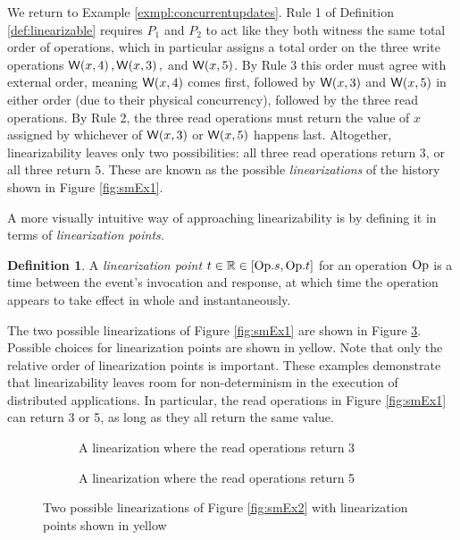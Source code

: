 \documentclass[]             %
{NASA}                       %
\newtheorem{example}{Example}
\theoremstyle{definition}
\newtheorem{definition}{Definition}[section]
\begin{document}
We return to Example \ref{exmpl:concurrentupdates}. Rule 1 of
Definition \ref{def:linearizable} requires $P_1$ and $P_2$ to act like
they both witness the same total order of operations, which in
particular assigns a total order on the three write operations
$\mathsf{W}\!\left(x, 4\right), \mathsf{W}\!\left(x, 3\right),$ and $\mathsf{W}\!\left(x, 5\right)$. By Rule 3 this order must agree with
external order, meaning $\mathsf{W}\!\left(x, 4\right)$ comes first, followed by $\mathsf{W}\!\left(x, 3\right)$ and
$\mathsf{W}\!\left(x, 5\right)$ in either order (due to their physical concurrency), followed
by the three read operations. By Rule 2, the three read operations
must return the value of $x$ assigned by whichever of $\mathsf{W}\!\left(x, 3\right)$ or
$\mathsf{W}\!\left(x, 5\right)$ happens last. Altogether, linearizability leaves only two
possibilities: all three read operations return $3$, or all three
return $5$. These are known as the possible \emph{linearizations} of
the history shown in Figure \ref{fig:smEx1}.

A more visually intuitive way of approaching linearizability is by
defining it in terms of \emph{linearization points.}

\begin{definition}
  A \emph{linearization point} $t \in \mathbb{R} \in [\mathrm{Op}.s, \mathrm{Op}.t]$
  for an operation $\mathrm{Op}$ is a time between the event's invocation and
  response, at which time the operation appears to take effect in
  whole and instantaneously.
\end{definition}

The two possible linearizations of Figure \ref{fig:smEx1} are shown in
Figure \ref{fig:smEx3}. Possible choices for linearization points are
shown in yellow. Note that only the relative order of linearization
points is important. These examples demonstrate that linearizability
leaves room for non-determinism in the execution of distributed
applications. In particular, the read operations in Figure
\ref{fig:smEx1} can return 3 or 5, as long as they all return the same
value.

\begin{figure}[p]
  \begin{subfigure}{1\textwidth}
    \centering
    
    \caption{A linearization where the read operations return 3}
    \label{fig:smEx1L1}
  \end{subfigure}
  \begin{subfigure}{1\textwidth}
    
        \caption{A linearization where the read operations return 5}
    \label{fig:smEx3L2}
  \end{subfigure}
  \caption{Two possible linearizations of Figure \ref{fig:smEx2} with linearization points shown in yellow}
  \label{fig:smEx3}
\end{figure}
\end{document}
